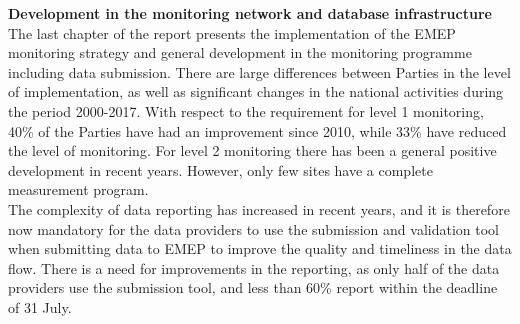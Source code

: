 \noindent
\textbf{Development in the monitoring network and database infrastructure}\\
The last chapter of the report presents the implementation of the EMEP monitoring strategy 
and general development in the monitoring programme including data submission. There are 
large differences between Parties in the level of implementation, as well as significant changes in the national activities during the period 2000-2017. With respect to the requirement 
for level 1 monitoring, 40\% of the Parties have had an improvement since 2010, 
while 33\% have reduced the level of monitoring. For level 2 monitoring there has been 
a general positive development in recent years. However, only few sites have a complete measurement program.
\\
The complexity of data reporting has increased in recent years, and it is therefore now mandatory for the
data providers to use the submission and validation tool when submitting data to EMEP
to improve the quality and timeliness in the data flow. 
There is a need for improvements in the reporting, as only half of the data 
providers use the submission tool, and less than 60\% report within the deadline of 31 July.
\\

